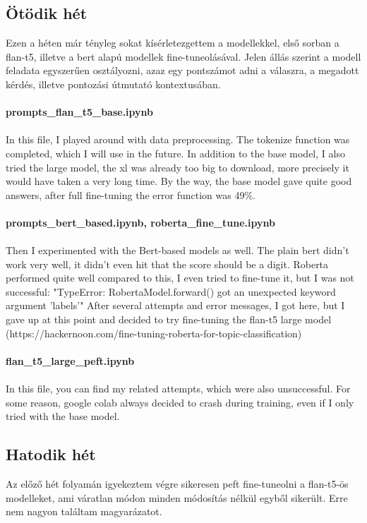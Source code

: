 \documentclass{article}
\begin{document}
\subsection{Ötödik hét}
Ezen a héten már tényleg sokat kísérletezgettem a modellekkel, első sorban a flan-t5, illetve a bert alapú modellek
fine-tuneolásával.
Jelen állás szerint a modell feladata egyszerűen osztályozni, azaz egy pontszámot adni a válaszra,
a megadott kérdés, illetve pontozási útmutató kontextusában.
\\
\\
\textbf{prompts\_flan\_t5\_base.ipynb}
\\
\\
\indent In this file, I played around with data preprocessing. The tokenize function was completed, which I will use in the future.
In addition to the base model, I also tried the large model, the xl was already too big to download, more precisely it would have taken a very long time.
By the way, the base model gave quite good answers, after full fine-tuning the error function was 49\%.
\\
\\
\textbf{prompts\_bert\_based.ipynb, roberta\_fine\_tune.ipynb}
\\
\\
\indent Then I experimented with the Bert-based models as well. The plain bert didn't work very well,
it didn't even hit that the score should be a digit.
Roberta performed quite well compared to this, I even tried to fine-tune it, but I was not successful:
"TypeError: RobertaModel.forward() got an unexpected keyword argument 'labels'"
After several attempts and error messages, I got here, but I gave up at this point and decided to try fine-tuning the flan-t5 large model
(https://hackernoon.com/fine-tuning-roberta-for-topic-classification)
\\
\\
\textbf{flan\_t5\_large\_peft.ipynb}
\\
\\
\indent In this file, you can find my related attempts, which were also unsuccessful. For some reason,
google colab always decided to crash during training, even if I only tried with the base model.

\subsection{Hatodik hét}

Az előző hét folyamán igyekeztem végre sikeresen peft fine-tuneolni a flan-t5-ös modelleket, ami váratlan módon minden
módosítás nélkül egyből sikerült. Erre nem nagyon találtam magyarázatot.
\end{document}
